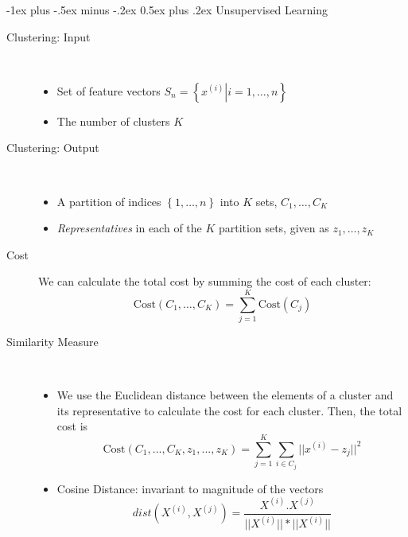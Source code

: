 \documentclass[a4paper, 10pt,landscape]{article}
\makeatletter
\renewcommand{\section}{\@startsection{section}{1}{0mm}%
                                {-1ex plus -.5ex minus -.2ex}%
                                {0.5ex plus .2ex}%
                                {\normalfont\large\bfseries}}
\makeatother
\begin{document}
\begin{multicols*}{3}
\section{Unsupervised Learning}
\begin{description}
	\item[Clustering: Input] ~
	\begin{itemize}[]
		\item Set of feature vectors $S_n=\left\{\left.x^{(i)}\right|i=1,\dots,n\right\}$
		\item The number of clusters $K$
	\end{itemize}
	\item[Clustering: Output] ~
	\begin{itemize}[]
		\item A partition of indices $\left\{1,\dots,n\right\}$ into $K$ sets, $C_1,\dots,C_K$
		\item {\it Representatives} in each of the $K$ partition sets, given as $z_1,\dots,z_K$
	\end{itemize}
	\item[Cost] We can calculate the total cost by summing the cost of each cluster:
	$$\text{Cost}\left(C_1,\dots,C_K\right)=\sum_{j=1}^{K}\text{Cost}\left(C_j\right)$$

	\item[Similarity Measure] ~
		\begin{itemize}
			\item We use the Euclidean distance between the elements of a cluster and its representative to calculate the cost for each cluster. Then, the total cost is
			$$\text{Cost}(C_1,...,C_K, z_1,...,z_K) = \sum_{j=1}^K \sum_{i \in C_j} || x^{(i)}-z_j||^2$$
			\item Cosine Distance: invariant to magnitude of the vectors
			$$dist(X^{(i)}, X^{(j)}) = \dfrac{X^{(i)} .  X^{(j)}}{||X^{(i)}|| *  ||X^{(i)}||}$$
		\end{itemize}


\end{description}
\end{multicols*}
\end{document}

